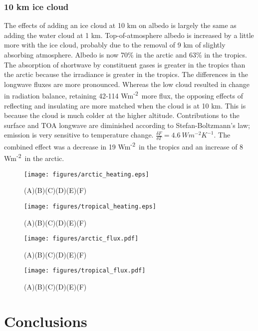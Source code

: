 \documentclass[twocol]{ametsoc}
\newcommand{\FU}{Wm\textsuperscript{-2}}
\begin{document}
\subsubsection{10 km ice cloud}
The effects of adding an ice cloud at 10 km on albedo is largely the same as adding the water cloud at 1 km. Top-of-atmosphere albedo is increased by a little more with the ice cloud, probably due to the removal of 9 km of slightly absorbing atmosphere. Albedo is now 70\% in the arctic and 63\% in the tropics. The absorption of shortwave by constituent gases is greater in the tropics than the arctic because the irradiance is greater in the tropics. The differences in the longwave fluxes are more pronounced. Whereas the low cloud resulted in change in radiation balance, retaining 42-114 \FU~more flux, the opposing effects of reflecting and insulating are more matched when the cloud is at 10 km.  This is because the cloud is much colder at the higher altitude. Contributions to the surface and TOA longwave are diminished according to Stefan-Boltzmann's law; emission is very sensitive to temperature change. $\frac{\delta F}{\delta T} = 4.6~W m^{-2}K^{-1}$. The combined effect was a decrease in 19 \FU~in the tropics and an increase of 8 \FU~in the arctic.

\begin{figure*}[h]
    \centering
    \texttt{[image: figures/arctic\_heating.eps]}
    \caption{(A)(B)(C)(D)(E)(F)}
    \label{fig:arc_heat}
\end{figure*}

\begin{figure*}[h]
    \centering
    \texttt{[image: figures/tropical\_heating.eps]}
    \caption{(A)(B)(C)(D)(E)(F)}
    \label{fig:trop_heat}
\end{figure*}

\begin{figure*}[h]
    \centering
    \texttt{[image: figures/arctic\_flux.pdf]}
    \caption{(A)(B)(C)(D)(E)(F)}
    \label{fig:arc_flux}
\end{figure*}

\begin{figure*}[h]
    \centering
    \texttt{[image: figures/tropical\_flux.pdf]}
    \caption{(A)(B)(C)(D)(E)(F)}
    \label{fig:trop_flux}
\end{figure*}

\section{Conclusions}
\end{document}
